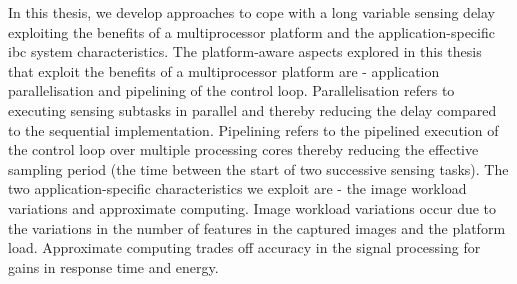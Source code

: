 In this thesis, we develop approaches to cope with a long variable sensing delay exploiting the benefits of a multiprocessor platform and the application-specific \gls{ibc} system characteristics.
The platform-aware aspects explored in this thesis that exploit the benefits of a multiprocessor platform are - application parallelisation and pipelining of the control loop.
Parallelisation refers to executing sensing subtasks in parallel and thereby reducing the delay compared to the sequential implementation. 
Pipelining refers to the pipelined execution of the control loop over multiple processing cores thereby reducing the effective sampling period (the time between the start of two successive sensing tasks).
The two application-specific characteristics we exploit are - the image workload variations and approximate computing. 
Image workload variations occur due to the variations in the number of features in the captured images and the platform load. 
Approximate computing trades off accuracy in the signal processing for gains in response time and energy.